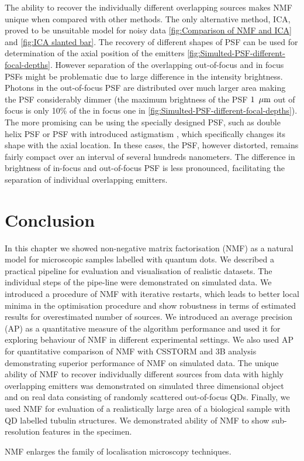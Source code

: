 The ability to recover the individually different overlapping sources makes NMF unique when compared with other methods. The only alternative method, ICA, proved to be unsuitable model for noisy data \autoref{fig:Comparison of NMF and ICA} and \ref{fig:ICA slanted bar}. The recovery of different shapes of PSF can be used for determination of the axial position of the emitters \autoref{fig:Simulted-PSF-different-focal-depths}. However separation of the overlapping out-of-focus and in focus PSFs might be problematic due to large difference in the intensity brightness. Photons in the out-of-focus PSF are distributed over much larger area making the PSF considerably dimmer (the maximum brightness of the PSF $1\ \, \mathrm{\mu m}$ out of focus is only 10\% of the in focus one in \autoref{fig:Simulted-PSF-different-focal-depths}). The more promising can be using the specially designed PSF, such as double helix PSF \cite{Quirin2011} or PSF with introduced astigmatism \cite{Huang2008}, which specifically changes its shape with the axial location. In these cases, the PSF, however distorted, remains fairly compact over an interval of several hundreds nanometers. The difference in brightness of in-focus and out-of-focus PSF is less pronounced, facilitating the separation of individual overlapping emitters.

\clearpage
\section{Conclusion\label{sec:Conclusion}}

In this chapter we showed non-negative matrix factorisation (NMF) as a natural model for microscopic samples labelled with quantum dots. We described a practical pipeline for evaluation and visualisation of realistic datasets. The individual steps of the pipe-line were demonstrated on simulated data. We introduced a procedure of NMF with iterative restarts, which leads to better local minima in the optimisation procedure and show robustness in terms of estimated results for overestimated number of sources. We introduced an average precision (AP) as a quantitative measure  of the algorithm performance and used it for exploring behaviour of NMF in different experimental settings. We also used AP for quantitative comparison of NMF with CSSTORM and 3B analysis demonstrating superior performance of NMF on simulated data. The unique ability of NMF to recover individually different sources from data with highly overlapping emitters was demonstrated on simulated three dimensional object and on real data consisting of randomly scattered out-of-focus QDs. Finally, we used NMF for evaluation of a realistically large area of a biological sample with QD labelled tubulin structures. We demonstrated ability of NMF to show sub-resolution features in the specimen.

NMF enlarges the family of localisation microscopy techniques. 

